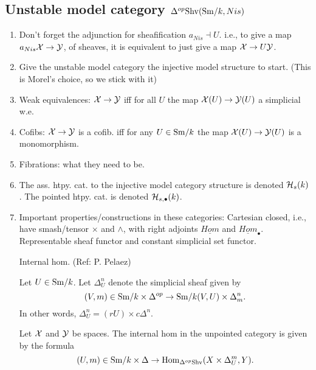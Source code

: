 \documentclass{amsart}%
\begin{document}
\subsection{Unstable model category $\Delta^{op} \mathrm{Shv}(\mathrm{Sm}/k,Nis)$}
\begin{enumerate}
    \item Don't forget the adjunction for sheafification
  $a_{Nis} \dashv U$. i.e., to give a map $a_{Nis}\mathcal{X} \to \mathcal{Y}$, of
  sheaves, it is equivalent to just give a map $\mathcal{X} \to U\mathcal{Y}$.

    \item Give the unstable model category the injective model
  structure to start. (This is Morel's choice, so we stick with it)

    \item Weak equivalences: $\mathcal{X} \to \mathcal{Y}$ iff for all $U$ the map
  $\mathcal{X}(U)\to \mathcal{Y}(U)$ a simplicial w.e.

    \item Cofibs: $\mathcal{X} \to \mathcal{Y}$ is a cofib. iff for any
  $U\in \mathrm{Sm}/k$ the map $\mathcal{X}(U) \to \mathcal{Y}(U)$ is a monomorphism.

    \item Fibrations: what they need to be. 

    \item The ass. htpy. cat. to the injective model category
  structure is denoted $\mathcal{H}_s(k)$. The pointed htpy. cat. is denoted
  $\mathcal{H}_{s,\bullet}(k)$.

    \item Important properties/constructions in these categories:
  Cartesian closed, i.e., have smash/tensor $\times$ and $\wedge$,
  with right adjoints $\underline{Hom}$ and
  $\underline{Hom}_{\bullet}$. Representable sheaf functor and
  constant simplicial set functor.

\begin{definition}
  Internal hom. (Ref: P. Pelaez)
  
  Let $U\in \mathrm{Sm}/k$. Let $\Delta^n_U$ denote the simplicial sheaf given by 
  \begin{equation*}
    (V,m) \in \mathrm{Sm}/k \times \Delta^{op} \to \mathrm{Sm}/k(V,U) \times \Delta^n_m.
  \end{equation*}
  In other words, $\Delta^n_U = (rU) \times c\Delta^n$. 

  Let $\mathcal{X}$ and $\mathcal{Y}$ be spaces. The internal hom in
  the unpointed category is given by the formula
  \begin{equation*}
    (U,m) \in \mathrm{Sm}/k\times \Delta \to \operatorname{Hom}_{\Delta^{op}\mathrm{Shv}}(X \times \Delta^{m}_U, Y).
  \end{equation*}


\end{definition}
\end{enumerate}
\end{document}

